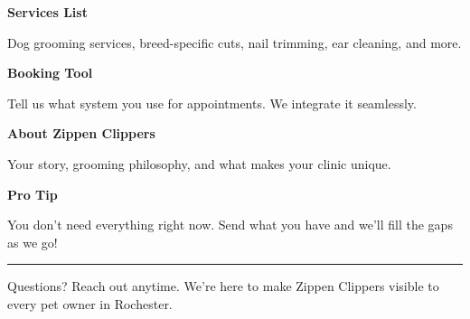 \documentclass[11pt,letterpaper]{article}
\begin{document}
\hfill
\begin{minipage}[t]{0.48\textwidth}
\begin{tcolorbox}[colframe=accent-teal, boxrule=1pt, left=0.7em, right=0.7em, top=0.5em, bottom=0.5em, arc=4pt, boxsep=0pt]
{\bfseries\small\color{accent-teal}Services List}

\vspace{0.15em}

{\small Dog grooming services, breed-specific cuts, nail trimming, ear cleaning, and more.}
\end{tcolorbox}

\vspace{0.1em}

\begin{tcolorbox}[colframe=accent-teal, boxrule=1pt, left=0.7em, right=0.7em, top=0.5em, bottom=0.5em, arc=4pt, boxsep=0pt]
{\bfseries\small\color{accent-teal}Booking Tool}

\vspace{0.15em}

{\small Tell us what system you use for appointments. We integrate it seamlessly.}
\end{tcolorbox}

\vspace{0.1em}

\begin{tcolorbox}[colframe=accent-teal, boxrule=1pt, left=0.7em, right=0.7em, top=0.5em, bottom=0.5em, arc=4pt, boxsep=0pt]
{\bfseries\small\color{accent-teal}About Zippen Clippers}

\vspace{0.15em}

{\small Your story, grooming philosophy, and what makes your clinic unique.}
\end{tcolorbox}

\vspace{-0.2em}
\end{minipage}

\vspace{0.15em}

\begin{tcolorbox}[colback={accent-red!5}, colframe=accent-red!20, boxrule=0.5pt, left=0.7em, right=0.7em, top=0.4em, bottom=0.4em, arc=6pt, boxsep=0pt]

{\bfseries\small\color{accent-red}Pro Tip}

\vspace{0.1em}

{\small You don't need everything right now. Send what you have and we'll fill the gaps as we go!}

\end{tcolorbox}

\vspace{0.15em}

\noindent\hrule
\vspace{0.2em}

{\small\color{text-light}Questions? Reach out anytime. We're here to make Zippen Clippers visible to every pet owner in Rochester.}
\end{document}
